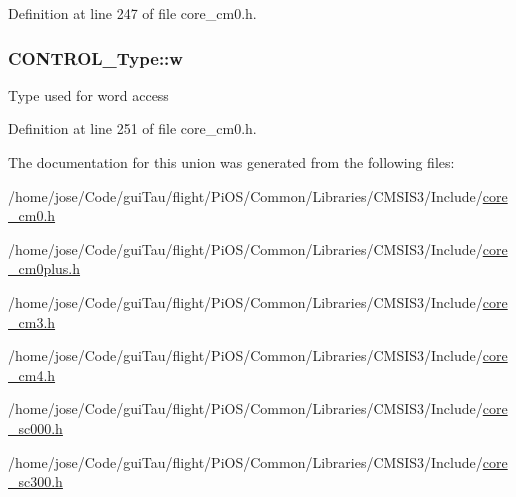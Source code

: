 Definition at line 247 of file core\-\_\-cm0.\-h.

\hypertarget{union_c_o_n_t_r_o_l___type_a6b642cca3d96da660b1198c133ca2a1f}{
\subsubsection[{w}]{ C\-O\-N\-T\-R\-O\-L\-\_\-\-Type\-::w}}\label{union_c_o_n_t_r_o_l___type_a6b642cca3d96da660b1198c133ca2a1f}
Type used for word access 

Definition at line 251 of file core\-\_\-cm0.\-h.



The documentation for this union was generated from the following files\-:\begin{DoxyCompactItemize}
\item 
/home/jose/\-Code/gui\-Tau/flight/\-Pi\-O\-S/\-Common/\-Libraries/\-C\-M\-S\-I\-S3/\-Include/\hyperlink{core__cm0_8h}{core\-\_\-cm0.\-h}\item 
/home/jose/\-Code/gui\-Tau/flight/\-Pi\-O\-S/\-Common/\-Libraries/\-C\-M\-S\-I\-S3/\-Include/\hyperlink{core__cm0plus_8h}{core\-\_\-cm0plus.\-h}\item 
/home/jose/\-Code/gui\-Tau/flight/\-Pi\-O\-S/\-Common/\-Libraries/\-C\-M\-S\-I\-S3/\-Include/\hyperlink{_common_2_libraries_2_c_m_s_i_s3_2_include_2core__cm3_8h}{core\-\_\-cm3.\-h}\item 
/home/jose/\-Code/gui\-Tau/flight/\-Pi\-O\-S/\-Common/\-Libraries/\-C\-M\-S\-I\-S3/\-Include/\hyperlink{core__cm4_8h}{core\-\_\-cm4.\-h}\item 
/home/jose/\-Code/gui\-Tau/flight/\-Pi\-O\-S/\-Common/\-Libraries/\-C\-M\-S\-I\-S3/\-Include/\hyperlink{core__sc000_8h}{core\-\_\-sc000.\-h}\item 
/home/jose/\-Code/gui\-Tau/flight/\-Pi\-O\-S/\-Common/\-Libraries/\-C\-M\-S\-I\-S3/\-Include/\hyperlink{core__sc300_8h}{core\-\_\-sc300.\-h}\end{DoxyCompactItemize}
